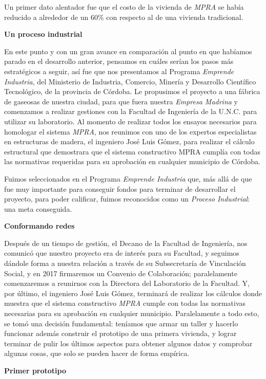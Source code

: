 \begin{fullwidth}
Un primer dato alentador fue que el costo de la vivienda de \emph{MPRA}
se había reducido a alrededor de un 60\% con respecto al de una vivienda
tradicional.

\textbf{Un proceso industrial}

En este punto y con un gran avance en comparación al punto en que
habíamos parado en el desarrollo anterior, pensamos en cuáles serían los
pasos más estratégicos a seguir, así fue que nos presentamos al Programa
\emph{Emprende Industria}, del Ministerio de Industria, Comercio,
Minería y Desarrollo Científico Tecnológico, de la provincia de Córdoba.
Le propusimos el proyecto a una fábrica de gaseosas de nuestra ciudad,
para que fuera nuestra \emph{Empresa Madrina} y comenzamos a realizar
gestiones con la Facultad de Ingeniería de la U.N.C. para utilizar su
laboratorio. Al momento de realizar todos los ensayos necesarios para
homologar el sistema \emph{MPRA}, nos reunimos con uno de los expertos
especialistas en estructuras de madera, el ingeniero José Luis Gómez,
para realizar el cálculo estructural que demostrara que el sistema
constructivo MPRA cumplía con todas las normativas requeridas para su
aprobación en cualquier municipio de Córdoba.

Fuimos seleccionados en el Programa \emph{Emprende Industria} que, más
allá de que fue muy importante para conseguir fondos para terminar de
desarrollar el proyecto, para poder calificar, fuimos reconocidos como
un \emph{Proceso Industrial}: una meta conseguida.

\textbf{Conformando redes}

Después de un tiempo de gestión, el Decano de la Facultad de Ingeniería,
nos comunicó que nuestro proyecto era de interés para su Facultad, y
seguimos dándole forma a nuestra relación a través de su Subsecretaría
de Vinculación Social, y en 2017 firmaremos un Convenio de Colaboración;
paralelamente comenzaremos a reunirnos con la Directora del Laboratorio
de la Facultad. Y, por último, el ingeniero José Luis Gómez, terminará
de realizar los cálculos donde muestra que el sistema constructivo
\emph{MPRA} cumple con todas las normativas necesarias para su
aprobación en cualquier municipio. Paralelamente a todo esto, se tomó
una decisión fundamental: teníamos que armar un taller y hacerlo
funcionar además construir el prototipo de una primera vivienda, y
lograr terminar de pulir los últimos aspectos para obtener algunos datos
y comprobar algunas cosas, que solo se pueden hacer de forma empírica.

\textbf{Primer prototipo}


\end{fullwidth}
